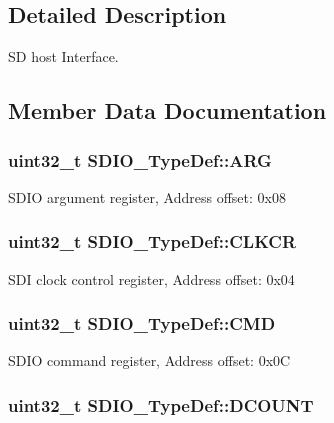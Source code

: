 \subsection{Detailed Description}
S\-D host Interface. 

\subsection{Member Data Documentation}
\hypertarget{struct_s_d_i_o___type_def_a3e24392875e98cd09043e54a0990ab7a}{
\subsubsection[{A\-R\-G}]{ uint32\-\_\-t S\-D\-I\-O\-\_\-\-Type\-Def\-::\-A\-R\-G}}\label{struct_s_d_i_o___type_def_a3e24392875e98cd09043e54a0990ab7a}
S\-D\-I\-O argument register, Address offset\-: 0x08 \hypertarget{struct_s_d_i_o___type_def_aeb1e30ce2038628e45264f75e5e926bb}{
\subsubsection[{C\-L\-K\-C\-R}]{ uint32\-\_\-t S\-D\-I\-O\-\_\-\-Type\-Def\-::\-C\-L\-K\-C\-R}}\label{struct_s_d_i_o___type_def_aeb1e30ce2038628e45264f75e5e926bb}
S\-D\-I clock control register, Address offset\-: 0x04 \hypertarget{struct_s_d_i_o___type_def_abbbdc3174e12dab21123d746d65f345d}{
\subsubsection[{C\-M\-D}]{ uint32\-\_\-t S\-D\-I\-O\-\_\-\-Type\-Def\-::\-C\-M\-D}}\label{struct_s_d_i_o___type_def_abbbdc3174e12dab21123d746d65f345d}
S\-D\-I\-O command register, Address offset\-: 0x0\-C \hypertarget{struct_s_d_i_o___type_def_a0366564e2795952d520c0de4be70020f}{
\subsubsection[{D\-C\-O\-U\-N\-T}]{ uint32\-\_\-t S\-D\-I\-O\-\_\-\-Type\-Def\-::\-D\-C\-O\-U\-N\-T}}\label{struct_s_d_i_o___type_def_a0366564e2795952d520c0de4be70020f}
